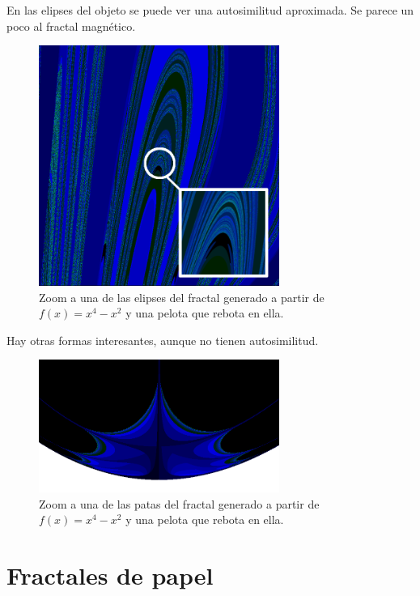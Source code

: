 \noindent En las elipses del objeto se puede ver una autosimilitud aproximada. Se parece un poco al fractal magnético.
\begin{figure}[H]
    \centering
    \includegraphics[width=0.7\textwidth]{figures/bouncing-ball-fractal-zoom-1.png}
    \caption{Zoom a una de las elipses del fractal generado a partir de $f(x) = x^4 - x^2$ y una pelota que rebota en ella.}
    \label{fig:ball-fractal-zoom}
\end{figure}

\noindent Hay otras formas interesantes, aunque no tienen autosimilitud.

\begin{figure}[H]
    \centering
    \includegraphics[width=0.7\textwidth]{figures/bouncing-ball-fractal-zoom-2.png}
    \caption{Zoom a una de las patas del fractal generado a partir de $f(x) = x^4 - x^2$ y una pelota que rebota en ella.}
    \label{fig:ball-fractal-zoom-2}
\end{figure}

\section{Fractales de papel}

